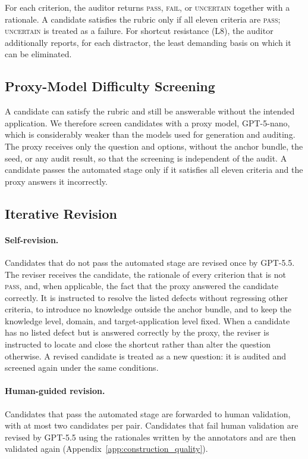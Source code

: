 For each criterion, the auditor returns \textsc{pass}, \textsc{fail}, or \textsc{uncertain} together with a rationale.
A candidate satisfies the rubric only if all eleven criteria are \textsc{pass}; \textsc{uncertain} is treated as a failure.
For shortcut resistance (L8), the auditor additionally reports, for each distractor, the least demanding basis on which it can be eliminated.

\subsection{Proxy-Model Difficulty Screening}

A candidate can satisfy the rubric and still be answerable without the intended application.
We therefore screen candidates with a proxy model, GPT-5-nano, which is considerably weaker than the models used for generation and auditing.
The proxy receives only the question and options, without the anchor bundle, the seed, or any audit result, so that the screening is independent of the audit.
A candidate passes the automated stage only if it satisfies all eleven criteria and the proxy answers it incorrectly.

\subsection{Iterative Revision}

\paragraph{Self-revision.}
Candidates that do not pass the automated stage are revised once by GPT-5.5.
The reviser receives the candidate, the rationale of every criterion that is not \textsc{pass}, and, when applicable, the fact that the proxy answered the candidate correctly.
It is instructed to resolve the listed defects without regressing other criteria, to introduce no knowledge outside the anchor bundle, and to keep the knowledge level, domain, and target-application level fixed.
When a candidate has no listed defect but is answered correctly by the proxy, the reviser is instructed to locate and close the shortcut rather than alter the question otherwise.
A revised candidate is treated as a new question: it is audited and screened again under the same conditions.

\paragraph{Human-guided revision.}
Candidates that pass the automated stage are forwarded to human validation, with at most two candidates per pair.
Candidates that fail human validation are revised by GPT-5.5 using the rationales written by the annotators and are then validated again (Appendix~\ref{app:construction_quality}).

